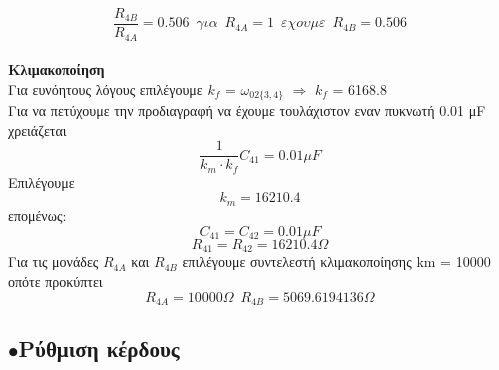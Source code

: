 \documentclass{article}
\begin{document}
{\begin{equation*}
\end{equation*}
\begin{equation*}
\frac{R_{4B}}{R_{4A}} = 0.506 \enspace για \enspace R_{4A} = 1 \enspace εχουμε \enspace R_{4B} = 0.506
\end{equation*}
\\[0.4\baselineskip]
\large{ {\textbf{Κλιμακοποίηση}} \\[0.4\baselineskip]}
\large{}
Για ευνόητους λόγους επιλέγουμε $k_f$ = $ω_{02\{3,4\}}$  $\Rightarrow$ $k_f$ = 6168.8 \\[0.4\baselineskip] 
Για να πετύχουμε την προδιαγραφή να έχουμε τουλάχιστον εναν πυκνωτή 0.01 μF χρειάζεται
\begin{equation*}
\frac{1}{k_m \cdot k_f} C_{41}= 0.01μF
\end{equation*}
Επιλέγουμε
\begin{equation*}
k_m = 16210.4 
\end{equation*}
επομένως:
\begin{equation*}
\boxed{
C_{41} = C_{42} = 0.01μF
}
\end{equation*}
\begin{equation*}
\boxed{
R_{41} = R_{42} = 16210.4   Ω
}
\end{equation*}
Για τις μονάδες $R_{4A}$ και $R_{4B}$ επιλέγουμε συντελεστή κλιμακοποίησης km = 10000 οπότε προκύπτει
\begin{equation*}
\boxed{R_{4A} = 10000   Ω} \enspace \boxed{R_{4B} = 5069.6194136 Ω}
\end{equation*}
\newpage
\subsection*{$\bullet$Ρύθμιση κέρδους}
 
 
}
\end{document}
